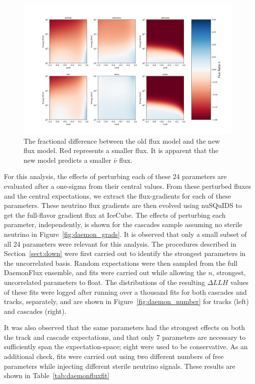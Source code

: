 \documentclass[main.tex]{subfiles}
\begin{document}
\begin{figure}
    \centering
    \includegraphics[width=0.8\linewidth]{figures/flux_plot_manyratio.png}
    \caption{The fractional difference between the old flux model and the new flux model. Red represents a smaller flux. It is apparent that the new model predicts a smaller $\bar{\nu}$ flux.}\label{fig:fractional_diff}
\end{figure}

For this analysis, the effects of perturbing each of these 24 parameters are evaluated after a one-sigma from their central values.
From these perturbed fluxes and the central expectations, we extract the flux-gradients for each of these parameters.
These neutrino flux gradients are then evolved using nuSQuIDS to get the full-flavor gradient flux at IceCube. 
The effects of perturbing each parameter, independently, is shown for the cascades sample assuming no sterile neutrino in Figure~\ref{fig:daemon_grads}.
It is observed that only a small subset of all 24 parameters were relevant for this analysis. 
The procedures described in Section~\ref{sect:down} were first carried out to identify the strongest parameters in the uncorrelated basis. 
Random expectations were then sampled from the full DaemonFlux ensemble, and fits were carried out while allowing the $n$, strongest, uncorrelated parameters to float. 
The distributions of the resulting $\Delta LLH$ values of these fits were logged after running over a thousand fits for both cascades and tracks, separately, and are shown in Figure~\ref{fig:daemon_number} for tracks (left) and cascades (right). 

It was also observed that the same parameters had the strongest effects on both the track and cascade expectations, and that only 7 parameters are necessary to sufficiently span the expectation-space; eight were used to be conservative. 
As an additional check, fits were carried out using two different numbers of free parameters while injecting different sterile neutrino signals. 
These results are shown in Table~\ref{tab:daemonfluxfit}
\end{document}
